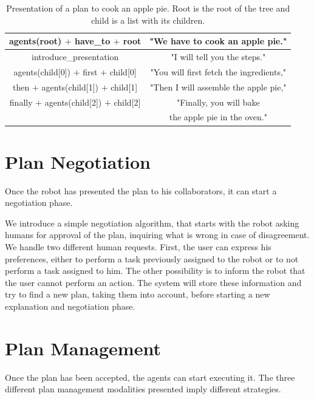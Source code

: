  \begin{table}
\centering
\scriptsize
\renewcommand{\arraystretch}{1.3}
\begin{tabular}{c|c}
   agents(root) $+$ have\_to $+$ root  & "We have to cook an apple pie." \\
   \hline
   introduce\_presentation & "I will tell you the steps." \\
   \hline
   agents(child[0]) $+$ first $+$ child[0] & "You will first fetch the ingredients," \\
   \hline
   then $+$ agents(child[1]) $+$  child[1] & "Then I will assemble the apple pie," \\
   \hline
   finally $+$ agents(child[2]) $+$  child[2] & "Finally, you will bake \\
   & the apple pie in the oven." \\
\end{tabular}
\caption{Presentation of a plan to cook an apple pie. Root is the root of the tree and child is a list with its children.}
 \label{table:plan_management-pie-present}    
\end{table}

\section{Plan Negotiation}
\label{sec:plan_management-negotiation}
Once the robot has presented the plan to his collaborators, it can start a negotiation phase. 

We introduce a simple negotiation algorithm, that starts with the robot asking humans for approval of the plan, inquiring what is wrong in case of disagreement. We handle two different human requests. First, the user can express his preferences, either to perform a task previously assigned to the robot or to not perform a task assigned to him. The other possibility is to inform the robot that the user cannot perform an action. The system will store these information and try to find a new plan, taking them into account, before starting a new explanation and negotiation phase.
 

\section{Plan Management}
\label{sec:plan_management-plan_manager}

Once the plan has been accepted, the agents can start executing it. The three different plan management modalities presented imply different strategies.


